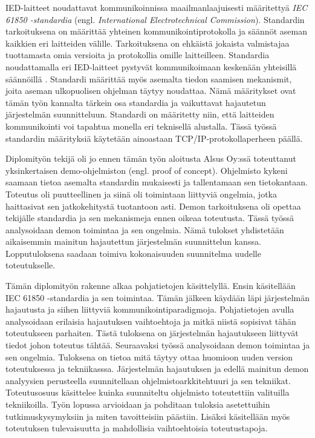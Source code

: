 IED-laitteet noudattavat kommunikoinnissa maailmanlaajuisesti määritettyä \emph{IEC 61850 -standardia} (engl. \emph{International Electrotechnical Commission}). Standardin tarkoituksena on määrittää yhteinen kommunikointiprotokolla ja säännöt aseman kaikkien eri laitteiden välille. Tarkoituksena on ehkäistä jokaista valmistajaa tuottamasta omia versioita ja protokollia omille laitteilleen. Standardia noudattamalla eri IED-laitteet pystyvät kommunikoimaan keskenään yhteisillä säännöillä \cite[s.~624]{Mackiewicz2006}. Standardi määrittää myös asemalta tiedon saamisen mekanismit, joita aseman ulkopuolisen ohjelman täytyy noudattaa. Nämä määritykset ovat tämän työn kannalta tärkein osa standardia ja vaikuttavat hajautetun järjestelmän suunnitteluun. Standardi on määritetty niin, että laitteiden kommunikointi voi tapahtua monella eri teknisellä alustalla. Tässä työssä standardin määrityksiä käytetään ainoastaan TCP/IP-protokollaperheen päällä.

Diplomityön tekijä oli jo ennen tämän työn aloitusta Alsus Oy:ssä toteuttanut yksinkertaisen demo-ohjelmiston (engl. proof of concept). Ohjelmisto kykeni saamaan tietoa asemalta standardin mukaisesti ja tallentamaan sen tietokantaan. Toteutus oli puutteellinen ja siinä oli toimintaan liittyviä ongelmia, jotka haittasivat sen jatkokehitystä tuotantoon asti. Demon tarkoituksena oli opettaa tekijälle standardia ja sen mekanismeja ennen oikeaa toteutusta. Tässä työssä analysoidaan demon toimintaa ja sen ongelmia. Nämä tulokset yhdistetään aikaisemmin mainitun hajautettun järjestelmän suunnittelun kanssa. Lopputuloksena saadaan toimiva kokonaisuuden suunnitelma uudelle toteutukselle.

Tämän diplomityön rakenne alkaa pohjatietojen käsittelyllä. Ensin käsitellään IEC 61850 -standardia ja sen toimintaa. Tämän jälkeen käydään läpi järjestelmän hajautusta ja siihen liittyviä kommunikointiparadigmoja. Pohjatietojen avulla analysoidaan erilaisia hajautuksen vaihtoehtoja ja mitkä niistä sopisivat tähän toteutukseen parhaiten. Tästä tuloksena on järjestelmän hajautukseen liittyvät tiedot johon toteutus tähtää. Seuraavaksi työssä analysoidaan demon toimintaa ja sen ongelmia. Tuloksena on tietoa mitä täytyy ottaa huomioon uuden version toteutuksessa ja tekniikasssa. Järjestelmän hajautuksen ja edellä mainitun demon analyysien perusteella suunnitellaan ohjelmistoarkkitehtuuri ja sen tekniikat. Toteutusosuus käsittelee kuinka suunniteltu ohjelmisto toteutettiin valituilla tekniikoilla. Työn lopussa arvioidaan ja pohditaan tuloksia asetettuihin tutkimuskysymyksiin ja miten tavoitteisiin päästiin. Lisäksi käsitellään myös toteutuksen tulevaisuutta ja mahdollisia vaihtoehtoisia toteutustapoja.


